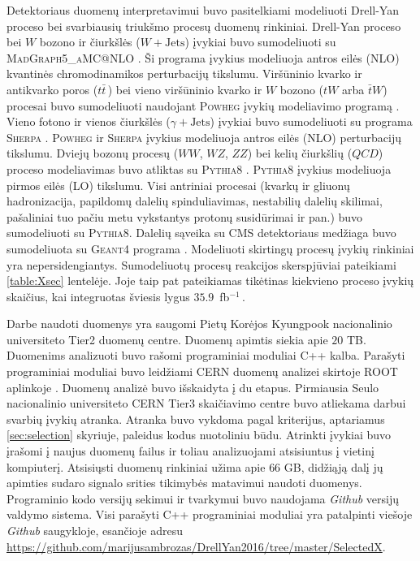 \documentclass[a4paper, 12pt, oneside]{article}
\newcommand{\ZZ}{Z\! Z}
\newcommand{\WZ}{W\! Z}
\newcommand{\tbarW}{\bar{t}W}
\newcommand{\gJets}{\gamma\! +\!\mathrm{Jets}}
\newcommand{\WJets}{W\! +\!\mathrm{Jets}}
\newcommand{\invfb}{fb$^{-1}\,$}
\newcommand{\QCD}{QC\! D}
\begin{document}
Detektoriaus duomenų interpretavimui buvo pasitelkiami modeliuoti Drell-Yan proceso bei svarbiausių triukšmo
procesų duomenų rinkiniai.
Drell-Yan proceso bei $W$ bozono ir čiurkšlės ($\WJets$) įvykiai buvo sumodeliuoti su
\textsc{MadGraph5\_aMC@NLO} \cite{MG_aMCatNLO}.
Ši programa įvykius modeliuoja antros eilės (NLO) kvantinės chromodinamikos perturbacijų tikslumu.
Viršūninio kvarko ir antikvarko poros ($t\bar{t}\,$) bei vieno viršūninio kvarko ir $W$ bozono ($tW$ arba
$\tbarW$) procesai buvo sumodeliuoti naudojant \textsc{Powheg} įvykių modeliavimo programą \cite{powheg_ttbar, powheg_tW}.
Vieno fotono ir vienos čiurkšlės ($\gJets$) įvykiai buvo sumodeliuoti su programa \textsc{Sherpa} \cite{Sherpa}.
\textsc{Powheg} ir \textsc{Sherpa} įvykius modeliuoja antros eilės (NLO) perturbacijų tikslumu.
Dviejų bozonų procesų ($WW$, $\WZ$, $\ZZ$) bei kelių čiurkšlių ($\QCD$) proceso modeliavimas buvo atliktas su
\textsc{Pythia8} \cite{pythia82}.
\textsc{Pythia8} įvykius modeliuoja pirmos eilės (LO) tikslumu.
Visi antriniai procesai (kvarkų ir gliuonų hadronizacija, papildomų dalelių
spinduliavimas, nestabilių dalelių skilimai, pašaliniai tuo pačiu metu vykstantys protonų susidūrimai ir pan.)
buvo sumodeliuoti su \textsc{Pythia8}.
Dalelių sąveika su CMS detektoriaus medžiaga buvo sumodeliuota su \textsc{Geant4} programa
\cite{geant4}.
Modeliuoti skirtingų procesų įvykių rinkiniai yra nepersidengiantys.
Sumodeliuotų procesų reakcijos skerspjūviai pateikiami \ref{table:Xsec} lentelėje.
Joje taip pat pateikiamas tikėtinas kiekvieno proceso įvykių skaičius, kai integruotas šviesis lygus $35.9$~\invfb.

Darbe naudoti duomenys yra saugomi Pietų Korėjos Kyungpook nacionalinio universiteto Tier2 duomenų centre.
Duomenų apimtis siekia apie $20$ TB.
Duomenims analizuoti buvo rašomi programiniai moduliai C++ kalba.
Parašyti programiniai moduliai buvo leidžiami CERN duomenų analizei skirtoje ROOT aplinkoje \cite{ROOTarticle}.
Duomenų analizė buvo išskaidyta į du etapus.
Pirmiausia Seulo nacionalinio universiteto CERN Tier3 skaičiavimo centre buvo atliekama darbui svarbių įvykių atranka.
Atranka buvo vykdoma pagal kriterijus, aptariamus \ref{sec:selection} skyriuje, paleidus kodus nuotoliniu būdu.
Atrinkti įvykiai buvo įrašomi į naujus duomenų failus ir toliau analizuojami atsisiuntus į vietinį kompiuterį.
Atsisiųsti duomenų rinkiniai užima apie $66$ GB, didžiąją dalį jų apimties sudaro signalo srities tikimybės matavimui
naudoti duomenys.
Programinio kodo versijų sekimui ir tvarkymui buvo naudojama \textit{Github} versijų valdymo sistema.
Visi parašyti C++ programiniai moduliai yra patalpinti viešoje \textit{Github} saugykloje, esančioje adresu
\url{https://github.com/marijusambrozas/DrellYan2016/tree/master/SelectedX}.
\end{document}
